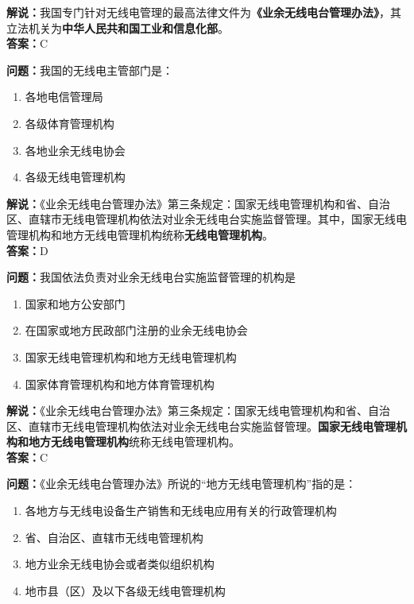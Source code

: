 \documentclass{ctexbook}
\begin{document}
\noindent\textbf{解说：}我国专门针对无线电管理的最高法律文件为\textbf{《业余无线电台管理办法》}，其立法机关为\textbf{中华人民共和国工业和信息化部}。\\\noindent\textbf{答案：}C

\bigskip


\noindent\textbf{问题：}我国的无线电主管部门是：

\begin{enumerate}[label=\Alph*), leftmargin=3em]
	\item 各地电信管理局
	\item 各级体育管理机构
	\item 各地业余无线电协会
	\item 各级无线电管理机构
\end{enumerate}

\noindent\textbf{解说：}《业余无线电台管理办法》第三条规定：国家无线电管理机构和省、自治区、直辖市无线电管理机构依法对业余无线电台实施监督管理。其中，国家无线电管理机构和地方无线电管理机构统称\textbf{无线电管理机构}。\\\noindent\textbf{答案：}D

\bigskip


\noindent\textbf{问题：}我国依法负责对业余无线电台实施监督管理的机构是

\begin{enumerate}[label=\Alph*), leftmargin=3em]
	\item 国家和地方公安部门
	\item 在国家或地方民政部门注册的业余无线电协会
	\item 国家无线电管理机构和地方无线电管理机构
	\item 国家体育管理机构和地方体育管理机构
\end{enumerate}

\noindent\textbf{解说：}《业余无线电台管理办法》第三条规定：国家无线电管理机构和省、自治区、直辖市无线电管理机构依法对业余无线电台实施监督管理。\textbf{国家无线电管理机构和地方无线电管理机构}统称无线电管理机构。\\\noindent\textbf{答案：}C

\bigskip


\noindent\textbf{问题：}《业余无线电台管理办法》所说的“地方无线电管理机构”指的是：

\begin{enumerate}[label=\Alph*), leftmargin=3em]
	\item 各地方与无线电设备生产销售和无线电应用有关的行政管理机构
	\item 省、自治区、直辖市无线电管理机构
	\item 地方业余无线电协会或者类似组织机构
	\item 地市县（区）及以下各级无线电管理机构
\end{enumerate}
\end{document}

